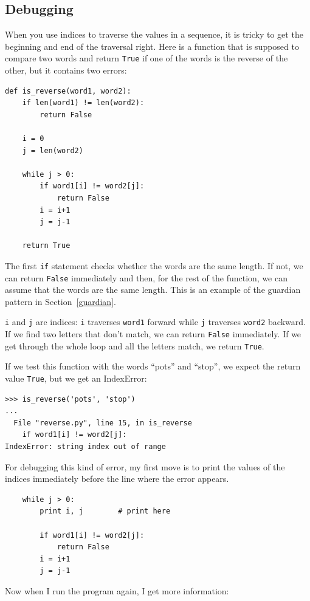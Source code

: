 \documentclass[10pt]{book}
\begin{document}
\begin{CJK}{UTF8}{gbsn}
\section{Debugging}

When you use indices to traverse the values in a sequence,
it is tricky to get the beginning and end of the traversal
right.  Here is a function that is supposed to compare two
words and return {\tt True} if one of the words is the reverse
of the other, but it contains two errors:

\begin{verbatim}
def is_reverse(word1, word2):
    if len(word1) != len(word2):
        return False
    
    i = 0
    j = len(word2)

    while j > 0:
        if word1[i] != word2[j]:
            return False
        i = i+1
        j = j-1

    return True
\end{verbatim}
%
The first {\tt if} statement checks whether the words are the
same length.  If not, we can return {\tt False} immediately
and then, for the rest of the function, we can assume that the words
are the same length.  This is an example of the guardian pattern
in Section~\ref{guardian}.

{\tt i} and {\tt j} are indices: {\tt i} traverses {\tt word1}
forward while {\tt j} traverses {\tt word2} backward.  If we find
two letters that don't match, we can return {\tt False} immediately.
If we get through the whole loop and all the letters match, we
return {\tt True}.

If we test this function with the words ``pots'' and ``stop'', we
expect the return value {\tt True}, but we get an IndexError:

\begin{verbatim}
>>> is_reverse('pots', 'stop')
...
  File "reverse.py", line 15, in is_reverse
    if word1[i] != word2[j]:
IndexError: string index out of range
\end{verbatim}
%
For debugging this kind of error, my first move is to
print the values of the indices immediately before the line
where the error appears.

\begin{verbatim}
    while j > 0:
        print i, j        # print here
        
        if word1[i] != word2[j]:
            return False
        i = i+1
        j = j-1
\end{verbatim}
%
Now when I run the program again, I get more information:


\end{CJK}
\end{document}
